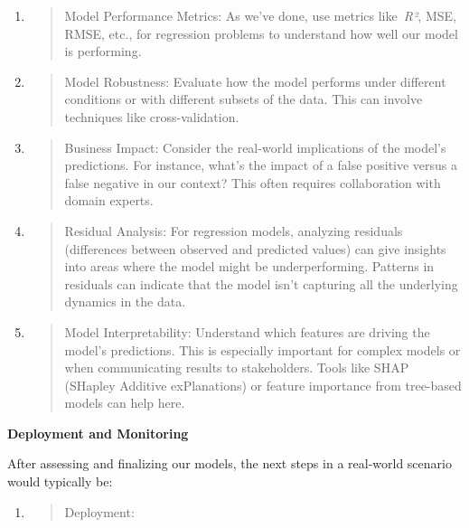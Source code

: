 \documentclass[
]{article}
\newcommand{\textcenter}[1]{\begin{center} \vspace{10px}\textbf{\large #1} \end{center}}
\begin{document}
\begin{enumerate}
\def\labelenumi{\arabic{enumi}.}
\item
  \begin{quote}
  Model Performance Metrics: As we've done, use metrics like~\emph{R²},
  MSE, RMSE, etc., for regression problems to understand how well our
  model is performing.
  \end{quote}
\item
  \begin{quote}
  Model Robustness: Evaluate how the model performs under different
  conditions or with different subsets of the data. This can involve
  techniques like cross-validation.
  \end{quote}
\item
  \begin{quote}
  Business Impact: Consider the real-world implications of the model's
  predictions. For instance, what's the impact of a false positive
  versus a false negative in our context? This often requires
  collaboration with domain experts.
  \end{quote}
\item
  \begin{quote}
  Residual Analysis: For regression models, analyzing residuals
  (differences between observed and predicted values) can give insights
  into areas where the model might be underperforming. Patterns in
  residuals can indicate that the model isn't capturing all the
  underlying dynamics in the data.
  \end{quote}
\item
  \begin{quote}
  Model Interpretability: Understand which features are driving the
  model's predictions. This is especially important for complex models
  or when communicating results to stakeholders. Tools like SHAP
  (SHapley Additive exPlanations) or feature importance from tree-based
  models can help here.
  \end{quote}
\end{enumerate}


\textcenter{Deployment and Monitoring}

After assessing and finalizing our models, the next steps in a
real-world scenario would typically be:

\begin{enumerate}
\def\labelenumi{\arabic{enumi}.}
\item
  \begin{quote}
  Deployment:
  \end{quote}
\end{enumerate}
\end{document}
